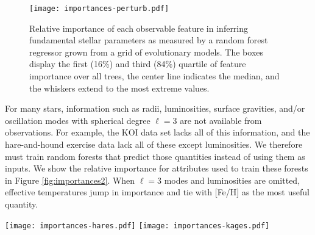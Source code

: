 \documentclass[manuscript,linenumbers]{aastex6}
\newcommand{\colwidth}{0.5\textwidth}
\begin{document}
\begin{figure}
    \centering
    \texttt{[image: importances-perturb.pdf]}
    \caption{Relative importance of each observable feature in inferring fundamental stellar parameters as measured by a random forest regressor grown from a grid of evolutionary models. The boxes display the first (16\%) and third (84\%) quartile of feature importance over all trees, the center line indicates the median, and the whiskers extend to the most extreme values.}
    \label{fig:importances}
\end{figure}


For many stars, information such as radii, luminosities, surface gravities, and/or oscillation modes with spherical degree $\ell=3$ are not available from observations. For example, the KOI data set lacks all of this information, and the hare-and-hound exercise data lack all of these except luminosities. We therefore must train random forests that predict those quantities instead of using them as inputs. We show the relative importance for attributes used to train these forests in Figure \ref{fig:importances2}. When $\ell=3$ modes and luminosities are omitted, effective temperatures jump in importance and tie with [Fe/H] as the most useful quantity. 

\begin{figure*}[!hbtp]
    \centering
    \texttt{[image: importances-hares.pdf]}\hfill
    \texttt{[image: importances-kages.pdf]}
    \caption{Box-and-whisker plots of relative importance for each observable feature in measuring fundamental stellar parameters for the hare-and-hound exercise data (left), where luminosities are available; and the \emph{Kepler} objects-of-interest (right), where they are not. Octupole ($\ell=3$) modes have not been measured in any of these stars, so $\langle\delta\nu_{1,3}\rangle$ and $\langle r_{1,3}\rangle$ from evolutionary modelling are not supplied to these random forests. The boxes are sorted by median importance.%
    \label{fig:importances2} }
\end{figure*}
\end{document}
